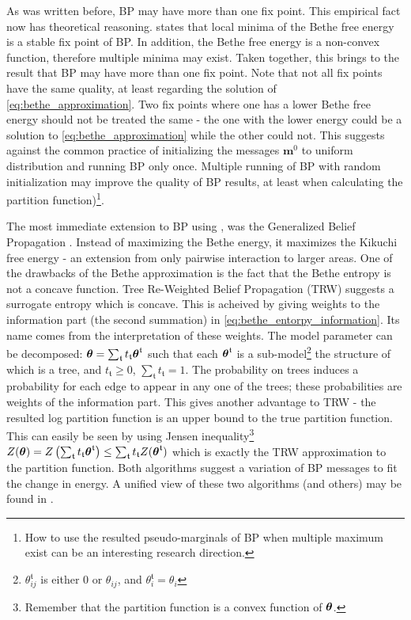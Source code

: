 As was written before, BP may have more than one fix point.
This empirical fact now has theoretical reasoning. 
 states that local minima of the Bethe free energy is a stable fix point of BP.
In addition, the Bethe free energy is a non-convex function, therefore multiple minima may exist.
Taken together, this brings to the result that BP may have more than one fix point.
Note that not all fix points have the same quality, at least regarding the solution of \eqref{eq:bethe_approximation}.
Two fix points where one has a lower Bethe free energy should not be treated the same - the one with the lower energy could be a solution to \eqref{eq:bethe_approximation} while the other could not.
This suggests against the common practice of initializing the messages $\boldsymbol{m}^0$ to uniform distribution and running BP only once.
Multiple running of BP with random initialization may improve the quality of BP results, at least when calculating the partition function)\footnote{How to use the resulted pseudo-marginals of BP when multiple maximum exist can be an interesting research direction.}.

The most immediate extension to BP using , was the Generalized Belief Propagation \cite{yedidia2000generalized}. 
Instead of maximizing the Bethe energy, it maximizes the Kikuchi free energy - an extension from only pairwise interaction to larger areas.
One of the drawbacks of the Bethe approximation is the fact that the Bethe entropy is not a concave function.
Tree Re-Weighted Belief Propagation (TRW) \cite{wainwright2003tree} suggests a surrogate entropy which is concave.
This is acheived by giving weights to the information part (the second summation) in \eqref{eq:bethe_entorpy_information}.
Its name comes from the interpretation of these weights.
The model parameter can be decomposed: $\boldsymbol{\theta}=\sum_{\mathfrak{t}} t_{\mathfrak{t}}\boldsymbol{\theta}^{\mathfrak{t}}$ such that each $\boldsymbol{\theta}^{\mathfrak{t}}$ is a sub-model\footnote{$\theta^{\mathfrak{t}}_{ij}$ is either $0$ or $\theta_{ij}$, and $\theta^{\mathfrak{t}}_i =\theta_i$} the structure of which is a tree, and $t_{\mathfrak{t}}\geq 0$, $\sum_{\mathfrak{t}} t_{\mathfrak{t}} = 1$.
The probability on trees induces a probability for each edge to appear in any one of the trees;
these probabilities are weights of the information part.
This gives another advantage to TRW - the resulted log partition function is an upper bound to the true partition function. 
This can easily be seen by using Jensen inequality\footnote{Remember that the partition function is a convex function of $\boldsymbol{\theta}$.} $Z(\boldsymbol{\theta}) = Z\left(\sum_{\mathfrak{t}} t_{\mathfrak{t}}\boldsymbol{\theta}^{\mathfrak{t}}\right) \leq \sum_{\mathfrak{t}} t_{\mathfrak{t}} Z(\boldsymbol{\theta}^{\mathfrak{t}})$ which is exactly the TRW approximation to the partition function.
Both algorithms suggest a variation of BP messages to fit the change in energy.
A unified view of these two algorithms (and others) may be found in \cite{meshi2009convexifying}.

